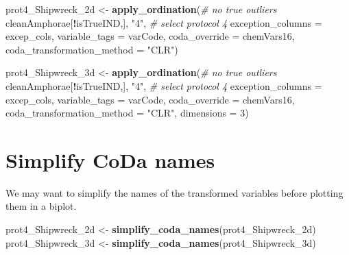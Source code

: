 \documentclass[12pt,]{book}
\newenvironment{Shaded}{\begin{snugshade}}{\end{snugshade}}
\newcommand{\CommentTok}[1]{\textcolor[rgb]{0.56,0.35,0.01}{\textit{#1}}}
\newcommand{\DataTypeTok}[1]{\textcolor[rgb]{0.13,0.29,0.53}{#1}}
\newcommand{\DecValTok}[1]{\textcolor[rgb]{0.00,0.00,0.81}{#1}}
\newcommand{\KeywordTok}[1]{\textcolor[rgb]{0.13,0.29,0.53}{\textbf{#1}}}
\newcommand{\NormalTok}[1]{#1}
\newcommand{\OperatorTok}[1]{\textcolor[rgb]{0.81,0.36,0.00}{\textbf{#1}}}
\newcommand{\StringTok}[1]{\textcolor[rgb]{0.31,0.60,0.02}{#1}}
\begin{document}
\begin{Shaded}
\begin{Highlighting}[]
\NormalTok{prot4_Shipwreck_2d <-}\StringTok{ }\KeywordTok{apply_ordination}\NormalTok{(}\CommentTok{# no true outliers}
\NormalTok{                                       cleanAmphorae[}\OperatorTok{!}\NormalTok{isTrueIND,],}
                                       \StringTok{"4"}\NormalTok{, }\CommentTok{# select protocol 4}
                                       \DataTypeTok{exception_columns =}\NormalTok{ excep_cols,}
                                       \DataTypeTok{variable_tags =}\NormalTok{ varCode,}
                                       \DataTypeTok{coda_override =}\NormalTok{ chemVars16,}
                                       \DataTypeTok{coda_transformation_method =} \StringTok{"CLR"}\NormalTok{)}

\NormalTok{prot4_Shipwreck_3d <-}\StringTok{ }\KeywordTok{apply_ordination}\NormalTok{(}\CommentTok{# no true outliers}
\NormalTok{                                       cleanAmphorae[}\OperatorTok{!}\NormalTok{isTrueIND,],}
                                       \StringTok{"4"}\NormalTok{, }\CommentTok{# select protocol 4}
                                       \DataTypeTok{exception_columns =}\NormalTok{ excep_cols,}
                                       \DataTypeTok{variable_tags =}\NormalTok{ varCode,}
                                       \DataTypeTok{coda_override =}\NormalTok{ chemVars16,}
                                       \DataTypeTok{coda_transformation_method =} \StringTok{"CLR"}\NormalTok{,}
                                       \DataTypeTok{dimensions =} \DecValTok{3}\NormalTok{)}
\end{Highlighting}
\end{Shaded}

\hypertarget{simplify-coda-names-3}{%
\section{Simplify CoDa names}\label{simplify-coda-names-3}}

We may want to simplify the names of the transformed variables before plotting them in a biplot.

\begin{Shaded}
\begin{Highlighting}[]
\NormalTok{prot4_Shipwreck_2d <-}\StringTok{ }\KeywordTok{simplify_coda_names}\NormalTok{(prot4_Shipwreck_2d)}
\NormalTok{prot4_Shipwreck_3d <-}\StringTok{ }\KeywordTok{simplify_coda_names}\NormalTok{(prot4_Shipwreck_3d)}
\end{Highlighting}
\end{Shaded}
\end{document}
